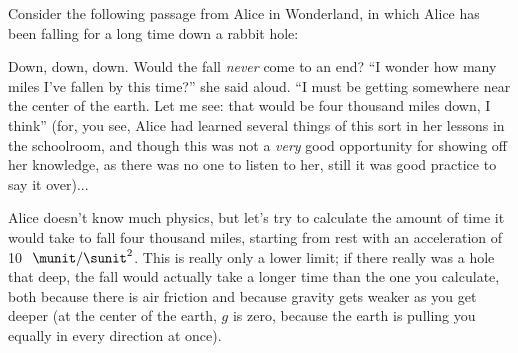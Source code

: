 Consider the following passage from Alice in Wonderland,
in which Alice has been falling for a long time down a rabbit hole:

Down, down, down. Would the fall \emph{never} come to an
end? ``I wonder how many miles I've fallen by this time?''
she said aloud. ``I must be getting somewhere near the
center of the earth. Let me see: that would be four thousand
miles down, I think'' (for, you see, Alice had learned
several things of this sort in her lessons in the schoolroom,
and though this was not a \emph{very} good opportunity for
showing off her knowledge, as there was no one to listen to
her, still it was good practice to say it over)...

Alice doesn't know much physics, but let's try to calculate
the amount of time it would take to fall four thousand
miles, starting from rest with an acceleration of 10
$\ \munit/\sunit^2$. This is really only a lower limit; if there really
was a hole that deep, the fall would actually take a longer
time than the one you calculate, both because there is air
friction and because gravity gets weaker as you get deeper
(at the center of the earth, $g$ is zero, because the earth
is pulling you equally in every direction at once).
\answercheck
